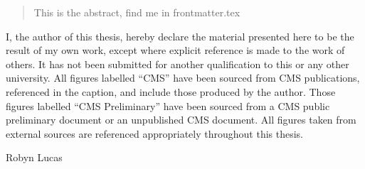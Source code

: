 
\begin{abstract}%
  This is the abstract, find me in frontmatter.tex
\end{abstract}


\begin{declaration}
  I, the author of this thesis, hereby declare the material presented here 
  to be the result of my own work, except where explicit
  reference is made to the work of others.
  It has not been submitted for another qualification to this or any other university. 
  All figures labelled ``CMS'' have been sourced from CMS publications, referenced in the caption, and include those produced by the author.
  Those figures labelled ``CMS Preliminary'' have been sourced from a CMS public preliminary document or an unpublished CMS document.
  All figures taken from external sources are referenced appropriately throughout this thesis.
  \vspace*{1cm}
  \begin{flushright}
   Robyn Lucas 
  \end{flushright}
\end{declaration}


\begin{acknowledgements}
\end{acknowledgements}



